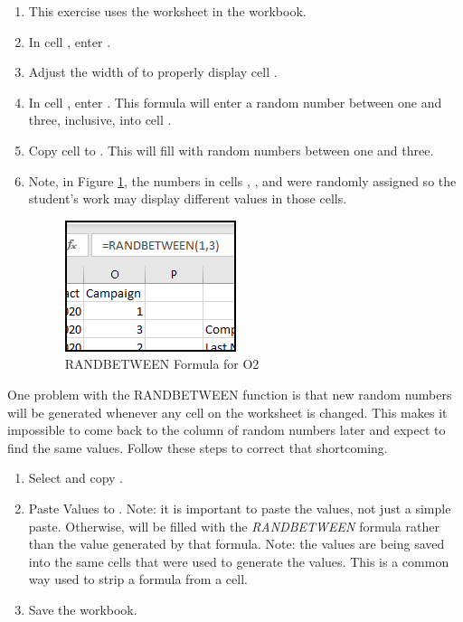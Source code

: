 \begin{enumerate}
	\item This exercise uses the  worksheet in the  workbook.
	\item In cell , enter .
	\item Adjust the width of  to properly display cell .
	\item In cell , enter . This formula will enter a random number between one and three, inclusive, into cell .
	\item Copy cell  to . This will fill  with random numbers between one and three.
	\item Note, in Figure \ref{09:fig44}, the numbers in cells , , and  were randomly assigned so the student's work may display different values in those cells.
	
	\begin{figure}[H]
		\centering
		\includegraphics[width=\maxwidth{.50\linewidth}]{gfx/ch09_fig44}
		\caption{RANDBETWEEN Formula for O2}
		\label{09:fig44}
	\end{figure}
	
\end{enumerate}
	
One problem with the RANDBETWEEN function is that new random numbers will be generated whenever any cell on the worksheet is changed. This makes it impossible to come back to the column of random numbers later and expect to find the same values. Follow these steps to correct that shortcoming.

\begin{enumerate}[resume]
	\item Select and copy .
	\item Paste Values to . Note: it is important to paste the values, not just a simple paste. Otherwise,  will be filled with the \textit{RANDBETWEEN} formula rather than the value generated by that formula. Note: the values are being saved into the same cells that were used to generate the values. This is a common way used to strip a formula from a cell.
	\item Save the  workbook.
\end{enumerate}

